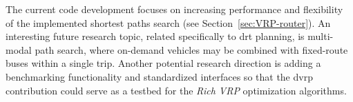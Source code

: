 The current code development focuses on increasing performance and flexibility of the implemented shortest paths search (see Section~\ref{sec:VRP-router}). An interesting future research topic, related specifically to \gls{drt} planning, is multi-modal path search, where on-demand vehicles may be combined with fixed-route buses within a single trip. Another potential research direction is adding a benchmarking functionality and standardized interfaces so that the \gls{dvrp} contribution could serve as a testbed for the \emph{Rich VRP} optimization algorithms.


